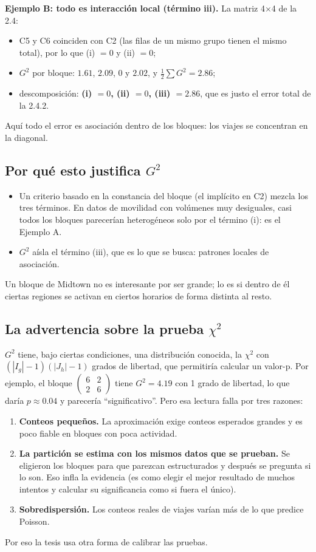 \documentclass[11pt,a4paper]{article}
\begin{document}
\textbf{Ejemplo B: todo es interacción local (término iii).} La matriz 4$\times$4
de la 2.4:
\begin{itemize}
  \item C5 y C6 coinciden con C2 (las filas de un mismo grupo tienen el mismo
  total), por lo que (i) $=0$ y (ii) $=0$;
  \item $G^2$ por bloque: $1.61$, $2.09$, $0$ y $2.02$, y $\tfrac12\sum G^2=2.86$;
  \item descomposición: \textbf{(i) $=0$, (ii) $=0$, (iii) $=2.86$}, que es justo
  el error total de la 2.4.2.
\end{itemize}
Aquí todo el error es asociación dentro de los bloques: los viajes se concentran
en la diagonal.

\subsection{Por qué esto justifica $G^2$}

\begin{itemize}
  \item Un criterio basado en la constancia del bloque (el implícito en C2) mezcla
  los tres términos. En datos de movilidad con volúmenes muy desiguales, casi todos
  los bloques parecerían heterogéneos solo por el término (i): es el Ejemplo A.
  \item $G^2$ aísla el término (iii), que es lo que se busca: patrones locales de
  asociación.
\end{itemize}
Un bloque de Midtown no es interesante por ser grande; lo es si dentro de él
ciertas regiones se activan en ciertos horarios de forma distinta al resto.

\subsection{La advertencia sobre la prueba $\chi^2$}

$G^2$ tiene, bajo ciertas condiciones, una distribución conocida, la $\chi^2$ con
$(|I_g|-1)(|J_h|-1)$ grados de libertad, que permitiría calcular un valor-p. Por
ejemplo, el bloque $\begin{pmatrix}6&2\\2&6\end{pmatrix}$ tiene $G^2=4.19$ con 1
grado de libertad, lo que daría $p\approx0.04$ y parecería ``significativo''. Pero
esa lectura falla por tres razones:
\begin{enumerate}
  \item \textbf{Conteos pequeños.} La aproximación exige conteos esperados grandes
  y es poco fiable en bloques con poca actividad.
  \item \textbf{La partición se estima con los mismos datos que se prueban.} Se
  eligieron los bloques para que parezcan estructurados y después se pregunta si
  lo son. Eso infla la evidencia (es como elegir el mejor resultado de muchos
  intentos y calcular su significancia como si fuera el único).
  \item \textbf{Sobredispersión.} Los conteos reales de viajes varían más de lo que
  predice Poisson.
\end{enumerate}
Por eso la tesis usa otra forma de calibrar las pruebas.
\end{document}
